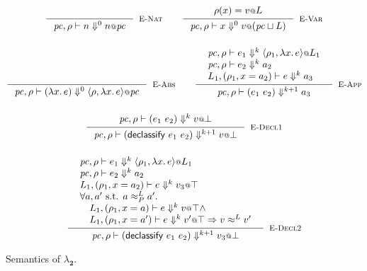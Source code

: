 \documentclass{article}
\makeatletter
\newcommand{\at}{\ensuremath{{\scriptstyle{@}}}}
\newcommand{\pc}{\ensuremath{{\mathit{pc}}}}
\theoremstyle{definition}
\makeatother
\begin{document}
\begin{figure}[ht]
  \centering
  \begin{gather*}
    \inference{}{
      \pc, \rho |- n \Downarrow^{0} n \at \pc
    }[\textsc{E-Nat}]
    \qquad
    \inference{
      {\begin{array}{l}
          \rho(x) = v \at L
        \end{array}}
    }{
      \pc, \rho |- x \Downarrow^{0} v \at (\pc \sqcup L)
    }[\textsc{E-Var}]
    \\[3ex]
    \inference{}{
      \pc, \rho |- (\lambda{x}.\, e) \Downarrow^{0}
      \langle{\rho, \lambda{x}.\, e\rangle} \at \pc
    }[\textsc{E-Abs}]
    \qquad
    \inference{
      {\begin{array}{l}
          \pc, \rho |- e_1 \Downarrow^{k}
          \langle{\rho_1, \lambda{x}.\, e\rangle} \at L_1
          \\
          \pc, \rho |- e_2 \Downarrow^{k} a_2
          \\
          L_1, (\rho_1, x = a_2) |- e \Downarrow^{k} a_3
        \end{array}}
    }{
      \pc, \rho |- (e_1\ e_2) \Downarrow^{k+1} a_3
    }[\textsc{E-App}]
    \\[3ex]
    \inference{
      {\begin{array}{l}
          \pc, \rho |- (e_1\ e_2) \Downarrow^{k} v \at \bot
        \end{array}}
    }{
      \pc, \rho |- (\mathsf{declassify}\ e_1\ e_2) \Downarrow^{k+1} v \at \bot
    }[\textsc{E-Decl1}]
    \\[3ex]
    \inference{
      {\begin{array}{l}
          \pc, \rho |- e_1 \Downarrow^{k}
          \langle{\rho_1, \lambda{x}.\, e\rangle} \at L_1
          \\
          \pc, \rho |- e_2 \Downarrow^{k} a_2
          \\
          L_1, (\rho_1, x = a_2) |- e \Downarrow^{k} v_3 \at \top
          \\
          \forall{a, a' \text{ s.t. } a \approx^{L}_{P} a'}.\,
          \\\quad
          L_1, (\rho_1, x = a) |- e \Downarrow^{k} v \at \top \land
          \\\quad
          L_1, (\rho_1, x = a') |- e \Downarrow^{k} v' \at \top =>
          v \approx^{L} v'
        \end{array}}
    }{
      \pc, \rho |- (\mathsf{declassify}\ e_1\ e_2) \Downarrow^{k+1} v_3 \at \bot
    }[\textsc{E-Decl2}]
  \end{gather*}
  \caption{Semantics of $\lambda_{\mathbf{2}}$.}
  \label{fig:semantics}
\end{figure}
\end{document}
